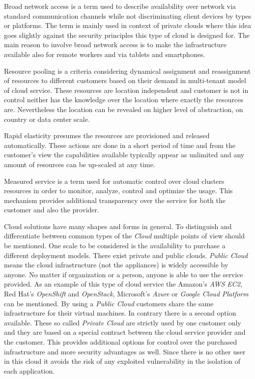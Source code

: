 Broad network access is a term used to describe availability over network via standard communication channels while not discriminating client devices by types or platforms. The term is mainly used in context of private clouds where this idea goes slightly against the security principles this type of cloud is designed for. The main reason to involve broad network access is to make the infrastructure available also for remote workers and via tablets and smartphones.

Resource pooling is a criteria considering dynamical assignment and reassignment of resources to different customers based on their demand in multi-tenant model of cloud service. These resources are location independent and customer is not in control neither has the knowledge over the location where exactly the resources are. Nevertheless the location can be revealed on higher level of abstraction, on country or data center scale.

Rapid elasticity presumes the resources are provisioned and released automatically. These actions are done in a short period of time and from the customer's view the capabilities available typically appear as unlimited and any amount of resources can be up-scaled at any time.

Measured service is a term used for automatic control over cloud clusters resources in order to monitor, analyze, control and optimize the usage. This mechanism provides additional transparency over the service for both the customer and also the provider.

Cloud solutions have many shapes and forms in general. To distinguish and differentiate between common types of the \emph{Cloud} multiple points of view should be mentioned. One scale to be considered is the availability to purchase a different deployment models. There exist private and public clouds. \emph{Public Cloud} means the cloud infrastructure (not the appliances) is widely accessible by anyone. No matter if organization or a person, anyone is able to use the service provided. As an example of this type of cloud service the Amazon's \emph{AWS EC2}, Red Hat's \emph{OpenShift} and \emph{OpenStack}, Microsoft's \emph{Azure} or \emph{Google Cloud Platform} can be mentioned. By using a \emph{Public Cloud} customers share the same infrastructure for their virtual machines. In contrary there is a second option available. These so called \emph{Private Cloud} are strictly used by one customer only and they are based on a special contract between the cloud service provider and the customer. This provides additional options for control over the purchased infrastructure and more security advantages as well. Since there is no other user in this cloud it avoids the risk of any exploited vulnerability in the isolation of each application.

